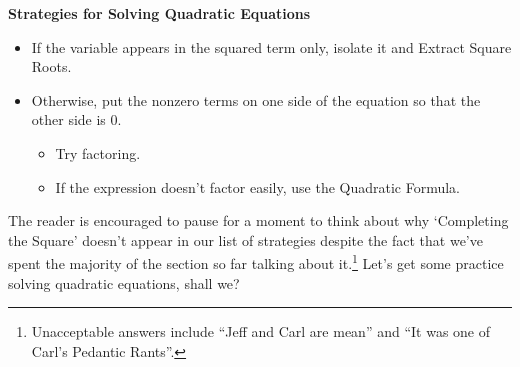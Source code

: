 \documentclass{ximera}
\begin{document}
 

\label{solvequadraticeqns}

\centerline{\textbf{Strategies for Solving Quadratic Equations}}

\begin{itemize}

\item  If the variable appears in the squared term only, isolate it and Extract Square Roots.
\item  Otherwise, put the nonzero terms on one side of the equation so that the other side is $0$.
\begin{itemize}
\item  Try factoring.  
\item  If the expression doesn't factor easily, use the Quadratic Formula.

\end{itemize}
\end{itemize}


 

The reader is encouraged to pause for a moment to think about why `Completing the Square' doesn't appear in our list of strategies despite the fact that we've spent the majority of the section so far talking about it.\footnote{Unacceptable answers include ``Jeff and Carl are mean'' and ``It was one of Carl's Pedantic Rants''.}  Let's get some practice solving quadratic equations, shall we?
\end{document}
